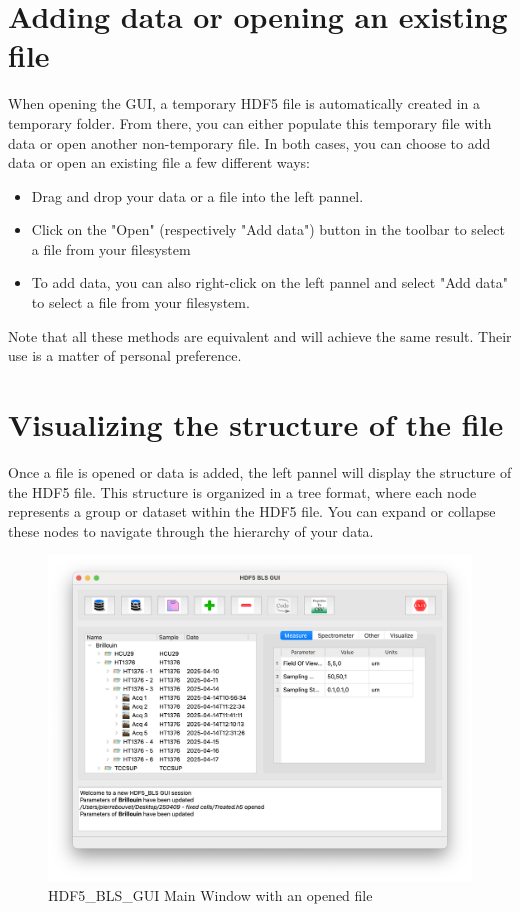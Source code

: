 \section{Adding data or opening an existing file}

    When opening the GUI, a temporary HDF5 file is automatically created in a temporary folder. From there, you can either populate this temporary file with data or open another non-temporary file. In both cases, you can choose to add data or open an existing file a few different ways:
    \begin{itemize} 
        \item Drag and drop your data or a file into the left pannel.
        \item Click on the "Open" (respectively "Add data") button in the toolbar to select a file from your filesystem
        \item To add data, you can also right-click on the left pannel and select "Add data" to select a file from your filesystem.
    \end{itemize}

    Note that all these methods are equivalent and will achieve the same result. Their use is a matter of personal preference.

\section{Visualizing the structure of the file}

    Once a file is opened or data is added, the left pannel will display the structure of the HDF5 file. This structure is organized in a tree format, where each node represents a group or dataset within the HDF5 file. You can expand or collapse these nodes to navigate through the hierarchy of your data.

    \begin{figure}[H]
        \centering
        \includegraphics[width=\textwidth]{img/main_window_hierarchy.png}
        \caption{HDF5\_BLS\_GUI Main Window with an opened file}
        \label{fig:gui_main_window_hierarchy}
    \end{figure}